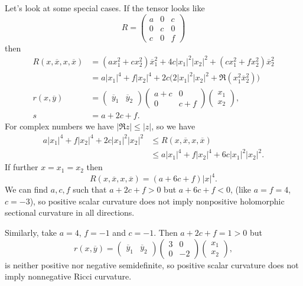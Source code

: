 \documentclass[11pt]{article}
\theoremstyle{definition}
\def\ov#1{\overline{#1}}
\begin{document}
Let's look at some special cases. If the tensor looks like
$$
R =
\begin{pmatrix}
a & 0 & c
\\
0 & c & 0
\\
c & 0 & f
\end{pmatrix}
$$
then
\begin{align*}
R(x, \ov x, x, \ov x)
&= (a x_1^2 + c x_2^2) \ov x_1^2
+ 4 c |x_1|^2 |x_2|^2
+ (c x_1^2 + f x_2^2) \ov x_2^2
\\
&= a |x_1|^4 + f |x_2|^4
+ 2 c \bigl(2 |x_1|^2 |x_2|^2 + \Re(x_1^2 \ov x_2^2) \bigr)
\\
r(x, \ov y)
&=
\begin{pmatrix}\ov y_1 & \ov y_2 \end{pmatrix}
\begin{pmatrix}
a + c & 0 \\ 0 & c + f
\end{pmatrix}
\begin{pmatrix} x_1 \\ x_2 \end{pmatrix},
\\
s &= a + 2c + f.
\end{align*}
For complex numbers we have $|\Re z| \leq |z|$, so we have
\begin{align*}
a |x_1|^4 + f |x_2|^4 + 2c |x_1|^2 |x_2|^2
&\leq R(x, \ov x, x, \ov x)
\\
&\leq a |x_1|^4 + f |x_2|^4 + 6c |x_1|^2 |x_2|^2.
\end{align*}
If further $x = x_1 = x_2$ then
$$
R(x, \ov x, x, \ov x)
= (a + 6c + f) |x|^4.
$$
We can find $a, c, f$ such that $a + 2c + f > 0$ but $a + 6c + f < 0$,
(like $a = f = 4$, $c = -3$), so positive scalar curvature does not imply
nonpositive holomorphic sectional curvature in all directions.

Similarly, take $a = 4$, $f = -1$ and $c = -1$. Then $a + 2c + f = 1 > 0$ but
$$
r(x, \ov y) =
\begin{pmatrix}\ov y_1 & \ov y_2 \end{pmatrix}
\begin{pmatrix}
3 & 0 \\ 0 & -2
\end{pmatrix}
\begin{pmatrix} x_1 \\ x_2 \end{pmatrix},
$$
is neither positive nor negative semidefinite, so positive scalar curvature
does not imply nonnegative Ricci curvature.
\end{document}
